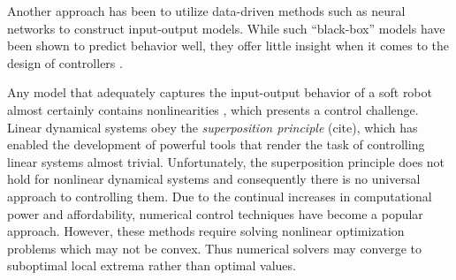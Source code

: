 Another approach has been to utilize data-driven methods such as neural networks \cite{gillespie2018learning} to construct input-output models.
While such ``black-box'' models have been shown to predict behavior well, they offer little insight when it comes to the design of controllers  .


Any model that adequately captures the input-output behavior of a soft robot almost certainly contains nonlinearities , which presents a control challenge.
Linear dynamical systems obey the \emph{superposition principle} (cite), which has enabled the development of powerful tools that render the task of controlling linear systems almost trivial.
Unfortunately, the superposition principle does not hold for nonlinear dynamical systems and consequently there is no universal approach to controlling them.
Due to the continual increases in computational power and affordability, numerical control techniques have become a popular approach.
However, these methods require solving nonlinear optimization problems which may not be convex.
Thus numerical solvers may converge to suboptimal local extrema rather than optimal values.



